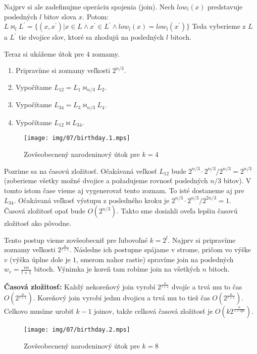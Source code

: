 Najprv si ale zadefinujme operáciu spojenia (join). Nech $low_l(x)$ predstavuje
posledných $l$ bitov slova $x$. Potom:
$L \bowtie_l L^{'} = \{(x, x^{'}) | x \in L \land x^{'} \in L^{'} \land low_{l}(x) = low_l(x^{'})\}$
Teda vyberieme z $L$ a $L^{'}$ tie dvojice slov, ktoré sa zhodujú na posledných
$l$ bitoch.

Teraz si ukážeme útok pre $4$ zoznamy. 
\begin{enumerate}
\item Pripravíme si zoznamy veľkosti $2^{n/3}$.
\item Vypočítame $L_{12} = L_1 \bowtie_{n/3} L_2$.
\item Vypočítame $L_{34} = L_3 \bowtie_{n/3} L_4$.
\item Vypočítame $L_{12} \bowtie L_{34}$.
\end{enumerate}

\begin{figure}
    \centering
    \texttt{[image: img/07/birthday.1.mps]}
    \caption{Zovšeobecnený narodeninový útok pre $k = 4$}
\end{figure}


Pozrime sa na časovú zložitosť. Očakávaná veľkosť $L_{12}$ bude $2^{n/3} \cdot 2^{n/3} / 2^{n/3} = 2^{n/3}$ (zoberieme všetky možné
dvojice a požadujeme rovnosť posledných $n/3$ bitov). V tomto istom čase vieme aj vygenerovať tento zoznam. To isté
dostaneme aj pre $L_{34}$. Očakávaná veľkosť výstupu z posledného kroku je $2^{n/3} \cdot 2^{n/3} / 2^{2n/3} = 1$.
Časová zložitosť opať bude $O(2^{n/3})$. Takto sme dosiahli oveľa lepšiu časovú zložitosť ako pôvodne.

Tento postup vieme zovšeobecniť pre ľubovoľné $k = 2^l$. 
Najprv si pripravíme zoznamy veľkosti $2^{\frac{n}{l+1}}$. Následne ich postupne spájame v strome, pričom
vo výške $v$ (výška úplne dole je $1$, smerom nahor rastie) spravíme join na posledných $w_v = \frac{vn}{l + 1}$
bitoch. Výnimka je koreň tam robíme join na všetkých $n$ bitoch.

{\bf Časová zložitosť:} Každý nekoreňový join vyrobí $2^{\frac{n}{l+1}}$ dvojíc a trvá mu to čas $O(2^{\frac{n}{l+1}})$.
Koreňový join vyrobí jednu dvojicu a trvá mu to tiež čas $O(2^{\frac{n}{l+1}})$. Celkovo musíme urobiť $k-1$ joinov, takže
celková časová zložitosť je $O(k 2^{\frac{n}{1+lg k}})$.

\begin{figure}
    \centering
    \texttt{[image: img/07/birthday.2.mps]}
    \caption{Zovšeobecnený narodeninový útok pre $k=8$}
\end{figure}

